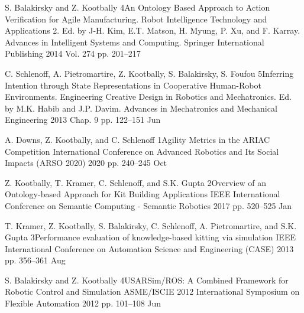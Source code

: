 \cvarticle
{S. Balakirsky and Z. Kootbally} %
{4}{An Ontology Based Approach to Action Verification for Agile Manufacturing.} %
{Robot Intelligence Technology and Applications 2. Ed. by J-H. Kim, E.T. Matson, H. Myung, P. Xu, and F. Karray. Advances in Intelligent Systems and Computing. Springer International Publishing} %
{2014} %
{Vol. 274} %
{} %
{pp. 201--217} %
{} %

\cvarticle
{C. Schlenoff, A. Pietromartire, Z. Kootbally, S. Balakirsky, S. Foufou} %
{5}{Inferring Intention through State Representations in Cooperative Human-Robot Environments.} %
{Engineering Creative Design in Robotics and Mechatronics. Ed. by M.K. Habib and J.P. Davim. Advances in Mechatronics and Mechanical Engineering} %
{2013} %
{Chap. 9} %
{} %
{pp. 122--151} %
{Jun} %



\cvinproceedings
{A. Downs, Z. Kootbally, and C. Schlenoff}%
{1}{Agility Metrics in the ARIAC Competition}%
{International Conference on Advanced Robotics and Its Social Impacts (ARSO 2020)}%
{2020}%
{pp. 240--245}%
{Oct}%

\cvinproceedings
{Z. Kootbally, T. Kramer, C. Schlenoff, and S.K. Gupta}%
{2}{Overview of an Ontology-based Approach for Kit  Building Applications}%
{IEEE International Conference on Semantic Computing - Semantic Robotics}%
{2017}%
{pp. 520--525}%
{Jan}%

\cvinproceedings
{T. Kramer, Z. Kootbally, S. Balakirsky, C. Schlenoff, A. Pietromartire, and S.K. Gupta}%
{3}{Performance evaluation of knowledge-based kitting via simulation}%
{IEEE International Conference on Automation Science and Engineering (CASE)}%
{2013}%
{pp. 356--361}%
{Aug}%

\cvinproceedings
{S. Balakirsky and Z. Kootbally}%
{4}{USARSim/ROS: A Combined Framework for Robotic Control and Simulation}%
{ASME/ISCIE 2012 International Symposium on Flexible Automation}%
{2012}%
{pp. 101--108}%
{Jun}%

